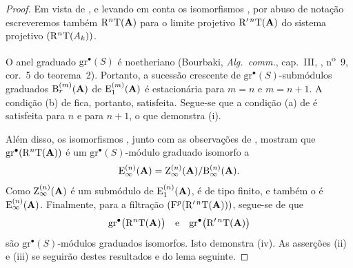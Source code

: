 \begin{proof}
Em vista de , e levando em conta os
isomorfismos , por abuso de notação escreveremos também
$\mathrm{R}^n\mathrm{T}(\mathbf{A})$ para o limite projetivo
$\mathrm{R}'^{\,n}\mathrm{T}(\mathbf{A})$ do sistema projetivo
$(\mathrm{R}^n\mathrm{T}(A_k))$.

O anel graduado $\mathrm{gr}^\bullet(S)$ é noetheriano
(Bourbaki, \emph{Alg.\ comm.}, cap.~III, ,
n\textsuperscript{o}~9, cor.~5 do teorema~2).
Portanto, a sucessão crescente de
$\mathrm{gr}^\bullet(S)$-submódulos graduados
$\mathrm{B}_r^{(m)}(\mathbf{A})$ de
$\mathrm{E}_1^{(m)}(\mathbf{A})$ é estacionária para $m=n$ e
$m=n+1$.
A condição {\rm(b)} de  fica, portanto, satisfeita.
Segue-se que a condição {\rm(a)} de  é satisfeita para
$n$ e para $n+1$, o que demonstra {\rm(i)}.

Além disso, os isomorfismos , junto com as
observações de , mostram que
$\mathrm{gr}^\bullet(\mathrm{R}^n\mathrm{T}(\mathbf{A}))$ é um
$\mathrm{gr}^\bullet(S)$-módulo graduado isomorfo a
\[
  \mathrm{E}_\infty^{(n)}(\mathbf{A})
  =
  \mathrm{Z}_\infty^{(n)}(\mathbf{A})
  /
  \mathrm{B}_\infty^{(n)}(\mathbf{A}).
\]
Como $\mathrm{Z}_\infty^{(n)}(\mathbf{A})$ é um submódulo de
$\mathrm{E}_1^{(n)}(\mathbf{A})$, é de tipo finito, e também o é
$\mathrm{E}_\infty^{(n)}(\mathbf{A})$.
Finalmente, para a filtração
$(\mathrm{F}^p(\mathrm{R}'^{\,n}\mathrm{T}(\mathbf{A})))$, segue-se de
 que
\[
  \mathrm{gr}^\bullet\bigl(\mathrm{R}^n\mathrm{T}(\mathbf{A})\bigr)
  \quad\hbox{e}\quad
  \mathrm{gr}^\bullet\bigl(\mathrm{R}'^{\,n}\mathrm{T}(\mathbf{A})\bigr)
\]
são $\mathrm{gr}^\bullet(S)$-módulos graduados isomorfos.
Isto demonstra {\rm(iv)}.
As asserções {\rm(ii)} e {\rm(iii)} se seguirão destes resultados
e do lema seguinte.
\end{proof}

